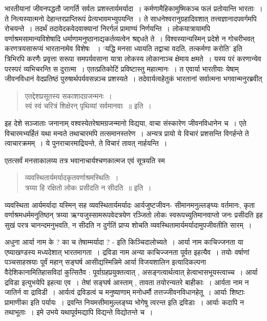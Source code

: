 {भारतीयानां जीवनपद्धतौ जागर्ति सर्वतः प्रशस्तार्यमर्यादा~। कर्मणामैहिकामुष्मिकञ्च फलं प्रतोयान्ति भारताः~। ते नित्यस्यात्मनो देहान्तरप्राप्तिरूपं प्रेत्यभावमभ्युपयन्ति~। ते साधनेश्वरानुग्रहादिवशात् तत्त्वज्ञानादपवर्गमपि रोचयन्ते~। तदर्थं तदावेदकवेदवाक्यानां निरर्गलं प्रामाण्यं निर्णयन्ति~। लोकयात्रायामपि वर्णाश्रमसामान्यविशेषादि धर्माणामनुष्ठानाद्यकर्तव्यत्वेन श्रद्दधते ते~। विश्वस्यान्यस्मिन् प्रदेशे न गोचरीभवत् करणत्रयसारूप्यं भारतानामेव विशेषः ~। ‘यद्धि मनसा ध्यायति  तद्वाचा वदति, तत्कर्मणा करोति’ इति त्रिभिरपि करणैः प्रवृत्ता सरूपा समपर्यवसाना यात्रा लोकस्य लोकानाञ्च क्षेमाय क्षमते~। यस्य परं करणान्येव परस्परं व्यभिचरन्ति स दुरात्मा~। एतत्प्रतिकोटिं प्रविष्टास्तु महात्मानः~। त एवार्या भारतीयाः येषाम् जीवनविधानं वेदप्रतिष्ठं पुरुषार्थपर्यवसन्नञ्च प्रशस्यते~। तदेवार्यत्वहेतुकं भारतानां सर्वात्मना भगवान्मनुरब्रवीत्  
\begin{verse}
एतद्देशप्रसूतस्य सकाशादग्रजन्मनः~। \\
स्वं स्वं चरित्रं शिक्षेरन् पृथिव्यां सर्वमानवाः~॥ इति~। 
\end{verse}
इह देशे सञ्जाताः जनानाम् वश्वस्येतरेषामग्रजन्मानो विद्यया, वाचा संस्कारेण जीवनविधानेन च~। एते विचारमभ्यर्हितं यथा मन्वते तथाचारमपि तत्समानस्तरेण~। अन्यत्र प्रायो ये विचारं प्रशसन्ति विगर्हन्ते ते त्वाचारक्रमम्~। ये पुनराचारमाद्रियन्ते, ते विचारं तावत् नार्हयन्ति~। 

एतत्सर्वं मनसाकालय्य तत्र भवानाचार्यश्चणकात्मज एवं सूत्रयति स्म 
\begin{verse}
व्यवस्थितार्यमर्यादकृतवर्णाश्रमस्थितिः~। \\
त्रय्या हि रक्षितो लोकः प्रसीदति न सीदति~॥ इति~। 
\end{verse}
व्यवस्थिता आर्यमर्यादा यस्मिन् सह व्यवस्थितार्यमर्यादः आर्यजुष्टजीवन- सीमानमनुल्लङ्घ्यः वर्तमानः, कृता वर्णाश्रमधर्ममनुतिष्ठन् त्रय्या ऋग्यजुस्सामरूपवेदत्रयेण रञ्जितो लोकः स्वरूपच्युतिमानवाप्तो जनः प्रसीदति इह सुखं परत्र चानन्दमनुभवति, न सीदति न दुर्गतिं प्राप्य शोचति व्यवस्थितामार्यमर्यादामुपजीवतीति सारम्~। 

अधुना आर्या नाम के ? का च तेषाम्मर्यादा ? - इति किञ्चिदालोच्यते~। आर्या नाम काचिज्जनता या एष्याखण्डस्य मध्यदेशात् भारतमागता~। द्रविडा नाम अन्या काचिज्जनता पूर्वत इहत्यैव~। तयोः वर्षाणां पञ्चसाहस्रयाः पूर्वं महान् सङ्घर्ष आसीद्यस्मिन्निमे आर्या विजयशालिन इत्यादिकल्पना वैदेशिकानामितिहासविदां कुत्सितैव : पूर्वाग्रहप्रयुक्तत्वात् , असङ्गत्वार्थत्वात् हेत्वाभासभूयस्त्वाच्च~। आर्या द्रविडा इत्युभयेपि इहत्या एव~। तेषां सङ्घर्ष आस्ताम् , तावता तयोरन्यतरे बाहीकाः~। आर्यता नाम न जातिर्न वा द्राविडी~। आर्यत्वं द्रविडत्वं च मनुष्याणाम् मनोधर्मौ तत्तज्जीवनविधानहेतू~। आर्याः शिष्टाः प्रामाणीका इति पर्यायः~। द्रवन्ति नियमसीमामुल्लङ्घ्य भोगेषु त्वरन्त इति द्रविडाः~। आर्याः कदापि न तथाभूताः~। इमे उभये यथापूर्वमद्यापि विद्यन्ते विद्योतन्ते च~। 

}
